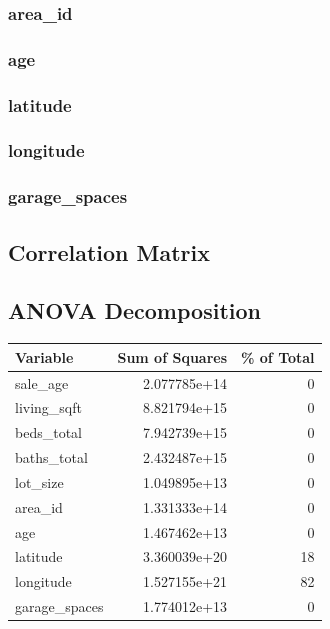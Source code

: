 \documentclass[
]{article}
\begin{document}
\subsubsection{area\_id}\label{area_id}

\subsubsection{age}\label{age}

\subsubsection{latitude}\label{latitude}

\subsubsection{longitude}\label{longitude}

\subsubsection{garage\_spaces}\label{garage_spaces}

\subsection{Correlation Matrix}\label{correlation-matrix}

\subsection{ANOVA Decomposition}\label{anova-decomposition}

{\def\LTcaptype{} %
\begin{longtable}[]{@{}lrr@{}}
\toprule\noalign{}
Variable & Sum of Squares & \% of Total \\
\midrule\noalign{}
\endhead
\bottomrule\noalign{}
\endlastfoot
sale\_age & 2.077785e+14 & 0 \\
living\_sqft & 8.821794e+15 & 0 \\
beds\_total & 7.942739e+15 & 0 \\
baths\_total & 2.432487e+15 & 0 \\
lot\_size & 1.049895e+13 & 0 \\
area\_id & 1.331333e+14 & 0 \\
age & 1.467462e+13 & 0 \\
latitude & 3.360039e+20 & 18 \\
longitude & 1.527155e+21 & 82 \\
garage\_spaces & 1.774012e+13 & 0 \\
\end{longtable}
}
\end{document}
